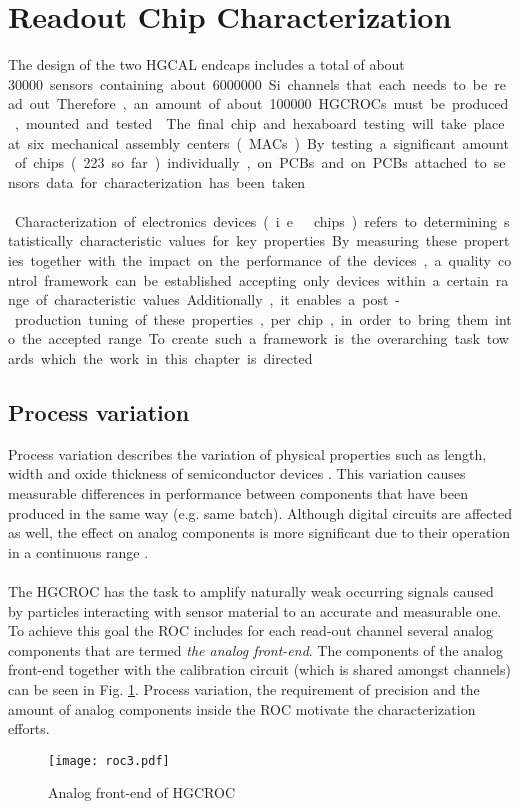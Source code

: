 \documentclass[../../main.tex]{subfiles}
\begin{document}
\section{Readout Chip Characterization}\label{chp:char}
The design of the two HGCAL endcaps includes a total of about \SI{30000} sensors containing about \SI{6000000} Si channels that each needs to be read out. Therefore, an amount of about \SI{100000} HGCROCs must be produced, mounted and tested \cite{si_rep, sipm_rep}. The final chip and hexaboard testing will take place at six mechanical assembly centers (MACs). By testing a significant amount of chips (223 so far) individually, on PCBs and on PCBs attached to sensors data for characterization has been taken.\\
\\
Characterization of electronics devices (i.e.\ chips) refers to determining statistically characteristic values for key properties. By measuring these properties together with the impact on the performance of the devices, a quality control framework can be established accepting only devices within a certain range of characteristic values. Additionally, it enables a post-production tuning of these properties, per chip, in order to bring them into the accepted range. To create such a framework is the overarching task towards which the work in this chapter is directed.\\

\subsection{Process variation}\label{sec:proc_var}
Process variation describes the variation of physical properties such as length, width and oxide thickness of semiconductor devices \cite{acm}. This variation causes measurable differences in performance between components that have been produced in the same way (e.g. same batch). Although digital circuits are affected as well, the effect on analog components is more significant due to their operation in a continuous range \cite{pd}.\\
\\
The HGCROC has the task to amplify naturally weak occurring signals caused by particles interacting with sensor material to an accurate and measurable one. To achieve this goal the ROC includes for each read-out channel several analog components that are termed \textit{the analog front-end}. The components of the analog front-end together with the calibration circuit (which is shared amongst channels) can be seen in Fig. \ref{fig:analogFE}. Process variation, the requirement of precision and the amount of analog components inside the ROC motivate the characterization efforts.
\begin{figure}[htp]
	\begin{center}
		\texttt{[image: roc3.pdf]}
		\caption{Analog front-end of HGCROC}
		\label{fig:analogFE}
	\end{center}
\end{figure}
\end{document}
